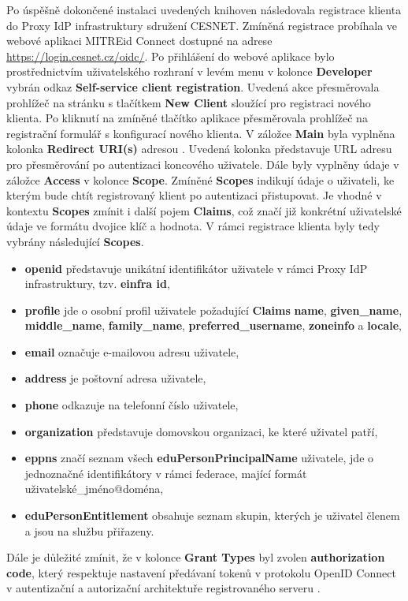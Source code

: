 \documentclass[
  printed, %
  twoside, %
  table,   %
  nolof,     %
  nolot,     %
]{fithesis3}
\begin{document}
Po úspěšně dokončené instalaci uvedených knihoven následovala registrace klienta  do Proxy IdP infrastruktury sdružení CESNET. Zmíněná registrace probíhala ve webové aplikaci MITREid Connect dostupné na adrese \url{https://login.cesnet.cz/oidc/}. Po přihlášení do webové aplikace bylo prostřednictvím uživatelského rozhraní v levém menu v kolonce \textbf{Developer} vybrán odkaz \textbf{Self-service client registration}. Uvedená akce přesměrovala prohlížeč na stránku s tlačítkem \textbf{New Client} sloužící pro registraci nového klienta. Po kliknutí na zmíněné tlačítko aplikace přesměrovala prohlížeč na registrační formulář s konfigurací nového klienta. V záložce \textbf{Main} byla vyplněna kolonka \textbf{Redirect URI(s)} adresou . Uvedená kolonka představuje URL adresu pro přesměrování po autentizaci koncového uživatele. Dále byly vyplněny údaje v záložce \textbf{Access} v kolonce \textbf{Scope}. Zmíněné \textbf{Scopes} indikují údaje o uživateli, ke kterým bude chtít registrovaný klient po autentizaci přistupovat. Je vhodné v kontextu \textbf{Scopes} zmínit i další pojem \textbf{Claims}, což značí již konkrétní uživatelské údaje ve formátu dvojice klíč a hodnota. V rámci registrace klienta byly tedy vybrány následující \textbf{Scopes}.

\begin{itemize}
    \item \textbf{openid} představuje unikátní identifikátor uživatele v rámci Proxy IdP infrastruktury, tzv. \textbf{einfra id},
    \item \textbf{profile} jde o osobní profil uživatele požadující \textbf{Claims} \textbf{name}, \textbf{given\_name}, \textbf{middle\_name}, \textbf{family\_name}, \textbf{preferred\_username}, \textbf{zoneinfo} a \textbf{locale},
    \item \textbf{email} označuje e-mailovou adresu uživatele,
    \item \textbf{address} je poštovní adresa uživatele,
    \item \textbf{phone} odkazuje na telefonní číslo uživatele,
    
    \item \textbf{organization} představuje domovskou organizaci, ke které uživatel patří,
    \item \textbf{eppns} značí seznam všech \textbf{eduPersonPrincipalName} uživatele, jde o jednoznačné identifikátory v rámci federace, mající formát uživatelské\_jméno@doména,  
    \item \textbf{eduPersonEntitlement} obsahuje seznam skupin, kterých je uživatel členem a jsou na službu  přiřazeny.
    
\end{itemize}
Dále je důležité zmínit, že v kolonce \textbf{Grant Types} byl zvolen \textbf{authorization code}, který respektuje nastavení předávaní tokenů v protokolu OpenID Connect v autentizační a autorizační architektuře registrovaného serveru .  \par
\end{document}
